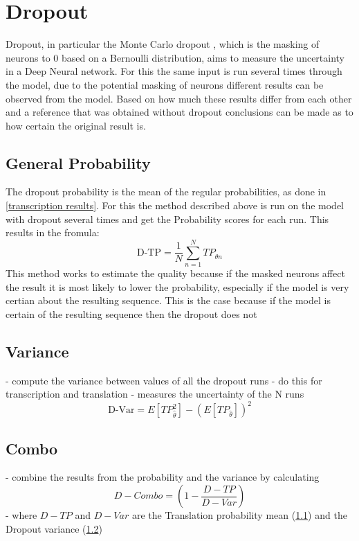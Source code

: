 \section{Dropout}
Dropout, in particular the Monte Carlo dropout \cite{gal2016dropoutbayesianapproximationrepresenting}, which is the masking of neurons to 0 based on a Bernoulli distribution, aims to measure the uncertainty in a Deep Neural network. 
For this the same input is run several times through the model, due to the potential masking of neurons different results can be observed from the model. Based on how much these results differ from each other and a reference that was obtained without dropout conclusions can be made as to how certain the original result is. 

\subsection{General Probability}
\label{dropoutprob}
The dropout probability is the mean of the regular probabilities, as done in \ref{transcription results}. 
For this the method described above is run on the model with dropout several times and get the Probability scores for each run. 
This results in the fromula:
$$\text{D-TP}=\frac{1}{N}\sum_{n=1}^N TP_{\hat\theta n}\label{formula:dropoutprobability}$$
This method works to estimate the quality because if the masked neurons affect the result it is most likely to lower the probability, especially if the model is very certian about the resulting sequence. This is the case because if the model is certain of the resulting sequence then the dropout does not 

\subsection{Variance}
\label{dropoutvar}
- compute the variance between values of all the dropout runs 
- do this for transcription and translation 
- measures the uncertainty of the N runs 
$$\text{D-Var}=E[TP_{\hat\theta}^2]-(E[TP_{\hat\theta}])^2\label{formula:dropoutvariance}$$

\subsection{Combo}
- combine the results from the probability and the variance by calculating $$D-Combo=(1-\frac{D-TP}{D-Var})\label{formula:Dropoutcombo}$$
- where $D-TP$ and $D-Var$ are the Translation probability mean (\ref{dropoutprob}) and the Dropout variance (\ref{dropoutvar})

